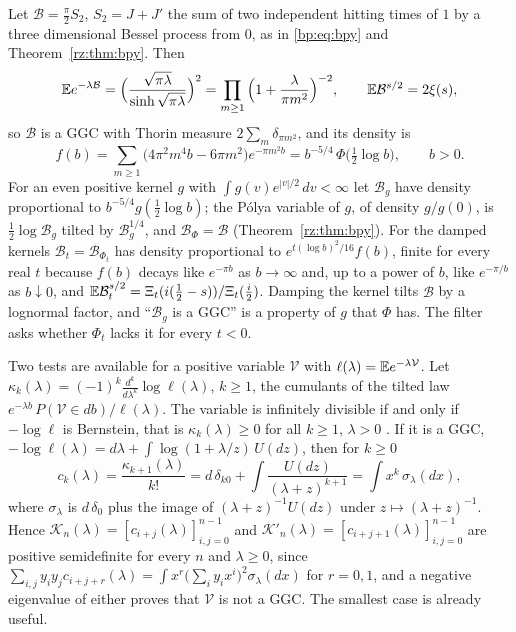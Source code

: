 Let $\mathcal B=\frac\pi2S_2$, $S_2=J+J'$ the sum of two independent hitting times of $1$ by a three dimensional Bessel process from $0$, as in \eqref{bp:eq:bpy} and Theorem~\ref{rz:thm:bpy}. Then
\begin{equation}\label{pk:eq:B}
\mathbb{E} e^{-\lambda\mathcal B}=\Big(\frac{\sqrt{\pi\lambda}}{\sinh\sqrt{\pi\lambda}}\Big)^2=\prod_{m\ge1}\Big(1+\frac\lambda{\pi m^2}\Big)^{-2},\qquad\mathbb{E}\mathcal B^{s/2}=2\xi(s),
\end{equation}
so $\mathcal B$ is a GGC with Thorin measure $2\sum_m\delta_{\pi m^2}$, and its density is
\[
f(b)=\sum_{m\ge1}\big(4\pi^2m^4b-6\pi m^2\big)e^{-\pi m^2b}=b^{-5/4}\,\Phi\big(\tfrac12\log b\big),\qquad b>0.
\]
For an even positive kernel $g$ with $\int g(v)e^{|v|/2}\,dv<\infty$ let $\mathcal B_g$ have density proportional to $b^{-5/4}g(\frac12\log b)$; the P\'olya variable of $g$, of density $g/\widehat g(0)$, is $\frac12\log\mathcal B_g$ tilted by $\mathcal B_g^{1/4}$, and $\mathcal B_\Phi=\mathcal B$ (Theorem~\ref{rz:thm:bpy}). For the damped kernels $\mathcal B_t=\mathcal B_{\Phi_t}$ has density proportional to $e^{t(\log b)^2/16}f(b)$, finite for every real $t$ because $f(b)$ decays like $e^{-\pi b}$ as $b\to\infty$ and, up to a power of $b$, like $e^{-\pi/b}$ as $b\downarrow0$, and $\mathbb{E}\mathcal B_t^{s/2}=\Xi_t(i(\frac12-s))/\Xi_t(\frac i2)$. Damping the kernel tilts $\mathcal B$ by a lognormal factor, and ``$\mathcal B_g$ is a GGC'' is a property of $g$ that $\Phi$ has. The filter asks whether $\Phi_t$ lacks it for every $t<0$.

Two tests are available for a positive variable $\mathcal V$ with $\ell(\lambda)=\mathbb{E} e^{-\lambda\mathcal V}$. Let $\kappa_k(\lambda)=(-1)^k\frac{d^k}{d\lambda^k}\log\ell(\lambda)$, $k\ge1$, the cumulants of the tilted law $e^{-\lambda b}\,P(\mathcal V\in db)/\ell(\lambda)$. The variable is infinitely divisible if and only if $-\log\ell$ is Bernstein, that is $\kappa_k(\lambda)\ge0$ for all $k\ge1$, $\lambda>0$ \cite{boSSV}. If it is a GGC, $-\log\ell(\lambda)=d\lambda+\int\log(1+\lambda/z)\,U(dz)$, then for $k\ge0$
\begin{equation}\label{pk:eq:ck}
c_k(\lambda)=\frac{\kappa_{k+1}(\lambda)}{k!}=d\,\delta_{k0}+\int\frac{U(dz)}{(\lambda+z)^{k+1}}=\int x^k\,\sigma_\lambda(dx),
\end{equation}
where $\sigma_\lambda$ is $d\,\delta_0$ plus the image of $(\lambda+z)^{-1}U(dz)$ under $z\mapsto(\lambda+z)^{-1}$. Hence $\mathcal K_n(\lambda)=[c_{i+j}(\lambda)]_{i,j=0}^{n-1}$ and $\mathcal K'_n(\lambda)=[c_{i+j+1}(\lambda)]_{i,j=0}^{n-1}$ are positive semidefinite for every $n$ and $\lambda\ge0$, since $\sum_{i,j}y_iy_jc_{i+j+r}(\lambda)=\int x^r\big(\sum_iy_ix^i\big)^2\sigma_\lambda(dx)$ for $r=0,1$, and a negative eigenvalue of either proves that $\mathcal V$ is not a GGC. The smallest case is already useful.

